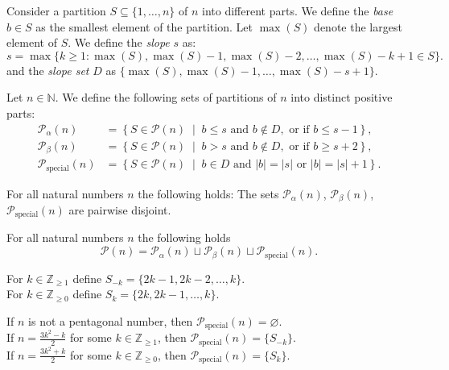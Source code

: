 \begin{definition}
  Consider a partition $S \subseteq \{1, \ldots, n\}$ of $n$ into different parts. We define the \emph{base} $b \in S$ as the smallest element of the partition. Let $\max(S)$ denote the largest element of $S$. We define the \emph{slope} $s$ as:
  \begin{equation*}
      s = \max\{k \geq 1 : \max(S), \max(S)-1, \max(S)-2, \ldots, \max(S)-k + 1 \in S\}.
  \end{equation*}
  and the \emph{slope set} $D$ as $\{\max(S), \max(S)-1, \ldots, \max(S)-s + 1\}$.
\end{definition}

\begin{definition} Let $n \in \mathbb{N}$. We define the following sets of partitions of $n$ into distinct positive parts:
\begin{align*}
\mathcal{P}_{\alpha}(n) &= \left\{ S \in \mathcal{P}(n) \;\middle|\;  b \leq s \mbox{ and } b \notin D, \mbox{ or if } b \leq s - 1\right\}, \\
\mathcal{P}_{\beta}(n) &= \left\{ S \in \mathcal{P}(n) \;\middle|\; b > s \mbox{ and } b \notin D, \mbox{ or if } b \geq s + 2 \right\}, \\
\mathcal{P}_{\mathrm{special}}(n)  &= \left\{ S \in \mathcal{P}(n) \;\middle|\; b\in D \mbox{ and } |b|=|s| \mbox{ or } |b|=|s|+1   \right\}.
\end{align*}
\end{definition}

\begin{lemma}For all natural numbers $n$ the following holds: The sets $\mathcal{P}_{\alpha}(n)$, $\mathcal{P}_{\beta}(n)$,  $\mathcal{P}_{\mathrm{special}}(n)$ are pairwise disjoint.
\end{lemma}

\begin{lemma} \label{lemma: alpha beta special}For all natural numbers $n$ the following holds $$\mathcal{P}(n)=\mathcal{P}_{\alpha}(n)\sqcup\mathcal{P}_{\beta}(n)\sqcup\mathcal{P}_{\mathrm{special}}(n).$$
\end{lemma}

\begin{definition}
For $k\in\mathbb{Z}_{\geq 1}$ define $ S_{-k}=\{2k-1 , 2k-2 , \ldots , k\}$.\\
For $k\in\mathbb{Z}_{\geq 0}$ define $S_{k}=\{2k , 2k-1 , \ldots , k\}$.
\end{definition}

\begin{lemma}\label{lemma: special} If $n$ is not a pentagonal number, then $ \mathcal{P}_{\mathrm{special}}(n)=\varnothing$.\\
If $n=\frac{3k^2-k}{2}$ for some $k\in\mathbb{Z}_{\geq 1}$, then $ \mathcal{P}_{\mathrm{special}}(n)=\{S_{-k}\} $.\\
If $n=\frac{3k^2+k}{2}$ for some $k\in\mathbb{Z}_{\geq 0}$, then $ \mathcal{P}_{\mathrm{special}}(n)=\{S_{k}\}$.
\end{lemma}


